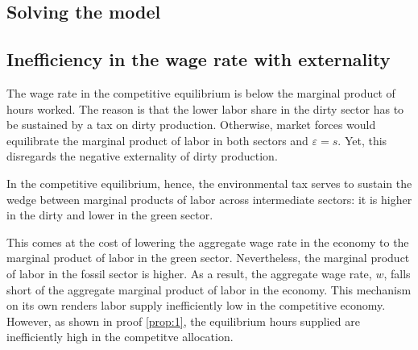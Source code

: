 \subsection{Solving the model}



\subsection{Inefficiency in the wage rate with externality}

The wage rate in the competitive equilibrium is below the marginal product of hours worked. 
The reason is that the lower labor share in the dirty sector has to be sustained by a tax on dirty production. 
Otherwise, market forces would equilibrate the marginal product of labor in both sectors and $\varepsilon=s$. Yet, this disregards the negative externality of dirty production. 

In the competitive equilibrium, hence, the environmental tax serves to sustain the wedge between marginal products of labor across intermediate sectors: it is higher in the dirty and lower in the green sector.

This comes at the cost of lowering the aggregate wage rate in the economy to the marginal product of labor in the green sector. 
Nevertheless, the marginal product of labor in the fossil sector is higher. As a result, the aggregate wage rate, $w$, falls short of the aggregate marginal product of labor in the economy. This mechanism on its own renders labor supply inefficiently low in the competitive economy. However, as shown in proof \ref{prop:1}, the equilibrium hours supplied are inefficiently high in the competitve allocation. 


